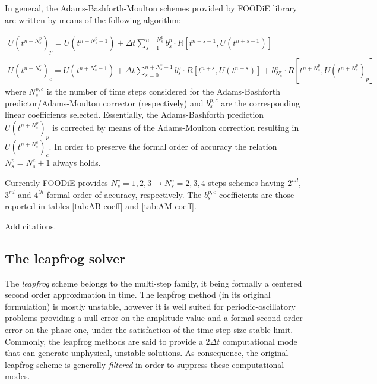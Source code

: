 \documentclass[pdftex,preprint,3p,times,numbers]{elsarticle}
\begin{document}
In general, the Adams-Bashforth-Moulton schemes provided by FOODiE library are written by means of the following algorithm:

\begin{equation}
  \begin{matrix}
    U\left(t^{n+N_s^p}\right)_p = U\left(t^{n+N_s^p-1}\right) +\Delta t \sum_{s=1}^{n+N_s^p}{ b_s^p \cdot R\left[t^{n+s-1}, U\left(t^{n+s-1}\right)\right]}   \\
    U\left(t^{n+N_s^c}\right)_c = U\left(t^{n+N_s^c-1}\right) +\Delta t \sum_{s=0}^{n+N_s^c-1}{ b_s^c \cdot R\left[t^{n+s}, U\left(t^{n+s}\right)\right]} + b_{N_s^c}^c\cdot R\left[t^{n+N_s^p}, U\left(t^{n+N_s^p}\right)_p\right]
  \end{matrix}
\label{eq:ABM}
\end{equation}
where $N_s^{p,c}$ is the number of time steps considered for the Adams-Bashforth predictor/Adams-Moulton corrector (respectively) and $b_s^{p,c}$ are the corresponding linear coefficients selected. Essentially, the Adams-Bashforth prediction $U\left(t^{n+N_s^p}\right)_p$ is corrected by means of the Adams-Moulton correction resulting in $U\left(t^{n+N_s^c}\right)_c$. In order to preserve the formal order of accuracy the relation $N_s^p=N_s^c+1$ always holds.

Currently FOODiE provides $N_s^c=1, 2, 3 \rightarrow N_s^c=2, 3, 4$ steps schemes having $2^{nd}$, $3^{rd}$ and $4^{th}$ formal order of accuracy, respectively. The $b_s^{p,c}$ coefficients are those reported in tables \ref{tab:AB-coeff} and \ref{tab:AM-coeff}.

{\color{red} Add citations.}

\subsection{The leapfrog solver}

The \emph{leapfrog} scheme belongs to the multi-step family, it being formally a centered second order approximation in time. The leapfrog method (in its original formulation) is mostly unstable, however it is well suited for periodic-oscillatory problems providing a null error on the amplitude value and a formal second order error on the phase one, under the satisfaction of the time-step size stable limit. Commonly, the leapfrog methods are said to provide a $2 \Delta t$ computational mode that can generate unphysical, unstable solutions. As consequence, the original leapfrog scheme is generally \emph{filtered} in order to suppress these computational modes.
\end{document}
